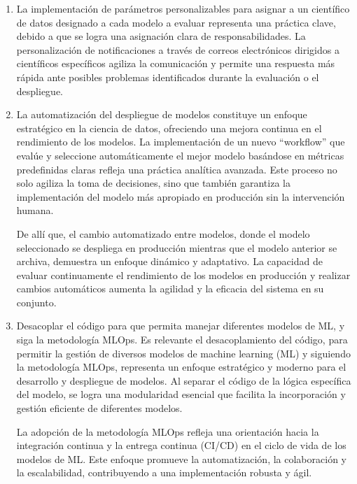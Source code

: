 \begin{enumerate}
	\item La implementación de parámetros personalizables para asignar a un científico de datos designado a cada modelo a evaluar representa una práctica clave, debido a que se logra una asignación clara de responsabilidades. La personalización de notificaciones a través de correos electrónicos dirigidos a científicos específicos agiliza la comunicación y permite una respuesta más rápida ante posibles problemas identificados durante la evaluación o el despliegue.

	\item La automatización del despliegue de modelos constituye un enfoque estratégico en la ciencia de datos, ofreciendo una mejora continua en el rendimiento de los modelos. La implementación de un nuevo “workflow” que evalúe y seleccione automáticamente el mejor modelo basándose en métricas predefinidas claras refleja una práctica analítica avanzada. Este proceso no solo agiliza la toma de decisiones, sino que también garantiza la implementación del modelo más apropiado en producción sin la intervención humana.

	De allí que, el cambio automatizado entre modelos, donde el modelo seleccionado se despliega en producción mientras que el modelo anterior se archiva, demuestra un enfoque dinámico y adaptativo. La capacidad de evaluar continuamente el rendimiento de los modelos en producción y realizar cambios automáticos aumenta la agilidad y la eficacia del sistema en su conjunto.

	\item Desacoplar el código para que permita manejar diferentes modelos de ML, y siga la metodología MLOps. Es relevante el desacoplamiento del código, para permitir la gestión de diversos modelos de machine learning (ML) y siguiendo la metodología MLOps, representa un enfoque estratégico y moderno para el desarrollo y despliegue de modelos. Al separar el código de la lógica específica del modelo, se logra una modularidad esencial que facilita la incorporación y gestión eficiente de diferentes modelos.

	La adopción de la metodología MLOps refleja una orientación hacia la integración continua y la entrega continua (CI/CD) en el ciclo de vida de los modelos de ML. Este enfoque promueve la automatización, la colaboración y la escalabilidad, contribuyendo a una implementación robusta y ágil.
\end{enumerate}


